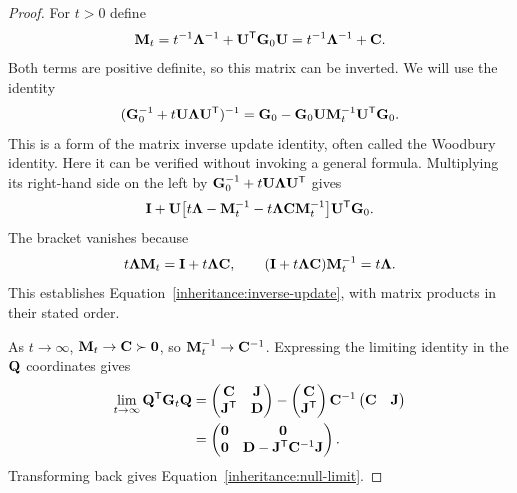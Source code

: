 \begin{proof}
  For $t>0$ define
  \begin{equation}
    \mathbf{M}_t=t^{-1}\mathbf{\Lambda}^{-1}+\mathbf{U}^{\mathsf T}\mathbf{G}_0\mathbf{U}
            =t^{-1}\mathbf{\Lambda}^{-1}+\mathbf{C}.
  \end{equation}
  Both terms are positive definite, so this matrix can be inverted.
  We will use the identity
  \begin{equation}
    (\mathbf{G}_0^{-1}+t\mathbf{U}\mathbf{\Lambda}\mathbf{U}^{\mathsf T})^{-1}
       =\mathbf{G}_0-\mathbf{G}_0\mathbf{U}\mathbf{M}_t^{-1}\mathbf{U}^{\mathsf T}\mathbf{G}_0.
    \label{inheritance:inverse-update}
  \end{equation}
  This is a form of the matrix inverse update identity, often called
  the Woodbury identity. Here it can be verified without invoking a
  general formula. Multiplying its right-hand side on the left by
  $\mathbf{G}_0^{-1}+t\mathbf{U}\mathbf{\Lambda}\mathbf{U}^{\mathsf T}$ gives
  \begin{equation}
    \mathbf{I}+\mathbf{U}
       \bigl[t\mathbf{\Lambda}-\mathbf{M}_t^{-1}
                   -t\mathbf{\Lambda}\mathbf{C}\mathbf{M}_t^{-1}\bigr]
         \mathbf{U}^{\mathsf T}\mathbf{G}_0.
  \end{equation}
  The bracket vanishes because
  \begin{equation}
    t\mathbf{\Lambda}\mathbf{M}_t=\mathbf{I}+t\mathbf{\Lambda}\mathbf{C},
    \qquad
    (\mathbf{I}+t\mathbf{\Lambda}\mathbf{C})\mathbf{M}_t^{-1}=t\mathbf{\Lambda}.
  \end{equation}
  This establishes Equation~\eqref{inheritance:inverse-update}, with
  matrix products in their stated order.

  As $t\to\infty$, $\mathbf{M}_t\to\mathbf{C}\succ\mathbf{0}$, so
  $\mathbf{M}_t^{-1}\to\mathbf{C}^{-1}$. Expressing the limiting identity
  in the $\mathbf{Q}$ coordinates gives
  \begin{align}
    \lim_{t\to\infty}\mathbf{Q}^{\mathsf T}\mathbf{G}_t\mathbf{Q}
       &=\begin{pmatrix}\mathbf{C}&\mathbf{J}\\\mathbf{J}^{\mathsf T}&\mathbf{D}\end{pmatrix}
         -\begin{pmatrix}\mathbf{C}\\\mathbf{J}^{\mathsf T}\end{pmatrix}
             \mathbf{C}^{-1}\begin{pmatrix}\mathbf{C}&\mathbf{J}\end{pmatrix}\\
       &=\begin{pmatrix}
            \mathbf{0}&\mathbf{0}\\
            \mathbf{0}&\mathbf{D}-\mathbf{J}^{\mathsf T}\mathbf{C}^{-1}\mathbf{J}
          \end{pmatrix}.
  \end{align}
  Transforming back gives Equation~\eqref{inheritance:null-limit}.


\end{proof}
